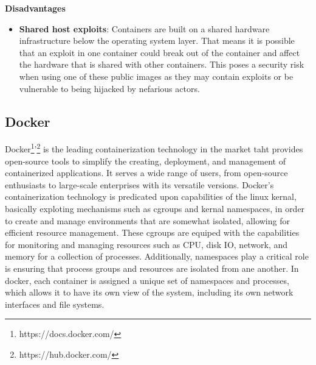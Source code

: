 \begin{enumerate}
          \textbf{Disadvantages}
          \begin{itemize}
              \item \textbf{Shared host exploits}: Containers are built on a shared hardware infrastructure below the operating system layer. That means it is possible that an exploit in one container could break out of the container and affect the hardware that is shared with other containers. This poses a security risk when using one of these public images as they may contain exploits or be vulnerable to being hijacked by nefarious actors.
          \end{itemize}
\end{enumerate}
\subsection{Docker}
Docker\footnote{https://docs.docker.com/}'\footnote{https://hub.docker.com/} \cite{Intro_Docker} is the leading containerization technology in the market taht provides open-source tools to simplify the creating, deployment, and management of containerized applications. It serves a wide range of users, from open-source enthusiasts to large-scale enterprises with its versatile versions.
\newline
Docker's containerization technology is predicated upon capabilities of the linux kernal, basically exploting mechanisms such as \ac{cgroups} and kernal namespaces, in order to create and manage environments that are somewhat isolated, allowing for efficient resource management.
These \ac{cgroups} are equiped with the capabilities for monitoring and managing resources such as CPU, disk IO, network, and memory for a collection of processes.
Additionally, namespaces play a critical role is ensuring that process groups and resources are isolated from ane another.
In docker, each container is assigned a unique set of namespaces and processes, which allows it to have its own view of the system, including its own network interfaces and file systems.

